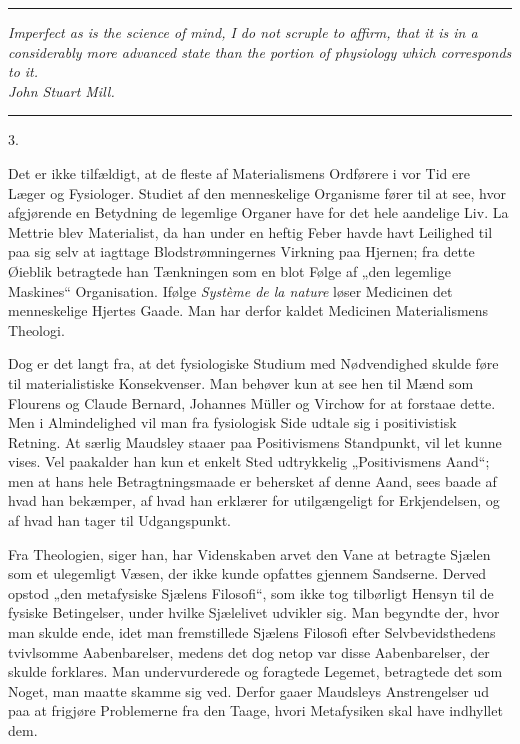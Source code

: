 \documentclass[12pt,a4paper,openany]{book}
\newcommand{\secnum}[1]{\par\begin{center}#1\end{center}\par\nobreak}
\newcommand{\opage}[1]{\marginnote{\footnotesize\textit{[#1]}}}
\begin{document}
\begin{center}\rule{1.8cm}{0.4pt}\end{center}

\begin{flushright}\begin{minipage}{0.6\textwidth}\small\textit{Imperfect as is the science of mind, I do not scruple to affirm, that it is in a considerably more advanced state than the portion of physiology which corresponds to it.}\\ \hfill\textit{John Stuart Mill.}\end{minipage}\end{flushright}

\begin{center}\rule{1.8cm}{0.4pt}\end{center}

\secnum{3.}

Det er ikke tilfældigt, at de fleste af Materialismens Ordførere
i vor Tid ere Læger og Fysiologer. Studiet af den
menneskelige Organisme fører til at see, hvor afgjørende en
Betydning de legemlige Organer have for det hele aandelige
Liv. La Mettrie blev Materialist, da han under en heftig
Feber havde havt Leilighed til paa sig selv at iagttage Blodstrømningernes
Virkning paa Hjernen; fra dette Øieblik betragtede
han Tænkningen som en blot Følge af „den legemlige Maskines“
Organisation. Ifølge \textit{Système de la nature} løser
Medicinen det menneskelige Hjertes Gaade. Man har derfor
kaldet Medicinen Materialismens Theologi.

Dog er det langt fra, at det fysiologiske Studium
med Nødvendighed skulde føre til materialistiske Konsekvenser.
Man behøver kun at see hen til Mænd som Flourens og
Claude Bernard, Johannes Müller og Virchow for at forstaae
dette. Men i Almindelighed vil man fra fysiologisk
\opage{310}Side udtale sig i positivistisk Retning. At særlig Maudsley
staaer paa Positivismens Standpunkt, vil let kunne vises.
Vel paakalder han kun et enkelt Sted udtrykkelig „Positivismens
Aand“; men at hans hele Betragtningsmaade er
behersket af denne Aand, sees baade af hvad han bekæmper,
af hvad han erklærer for utilgængeligt for Erkjendelsen, og
af hvad han tager til Udgangspunkt.

Fra Theologien, siger han, har Videnskaben arvet den
Vane at betragte Sjælen som et ulegemligt Væsen, der ikke
kunde opfattes gjennem Sandserne. Derved opstod „den
metafysiske Sjælens Filosofi“, som ikke tog tilbørligt Hensyn til
de fysiske Betingelser, under hvilke Sjælelivet udvikler sig.
Man begyndte der, hvor man skulde ende, idet man fremstillede
Sjælens Filosofi efter Selvbevidsthedens tvivlsomme Aabenbarelser,
medens det dog netop var disse Aabenbarelser, der
skulde forklares. Man undervurderede og foragtede Legemet,
betragtede det som Noget, man maatte skamme sig ved. Derfor
gaaer Maudsleys Anstrengelser ud paa at frigjøre Problemerne
fra den Taage, hvori Metafysiken skal have indhyllet dem.
\end{document}

